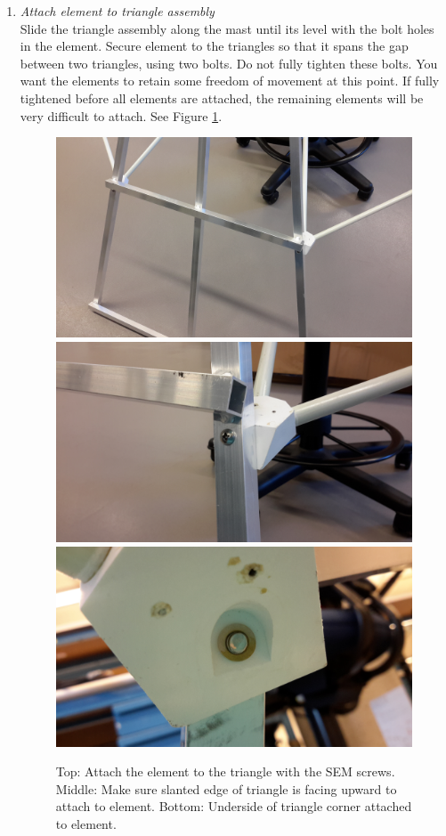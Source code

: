 \documentclass[12pt]{article}
\begin{document}
\begin{enumerate}
\begin{enumerate}
			\item \emph{Attach element to triangle assembly} \\ Slide the triangle assembly along the mast until its level with the bolt holes in the element. Secure element to the triangles so that it spans the gap between two triangles, using two bolts. Do not fully tighten these bolts. You want the elements to retain some freedom of movement at this point. If fully tightened before all elements are attached, the remaining elements will be very difficult to attach. See Figure \ref{Tri+Element}.

\begin{figure}[!p]
	\center
	\includegraphics[width=0.7\linewidth]{plots/20141125_102636.jpg}
	\includegraphics[width=0.7\linewidth]{plots/20141125_102607.jpg}
	\includegraphics[width=0.7\linewidth]{plots/20141125_102622.jpg}
	\caption{Top:  Attach the element to the triangle with the SEM screws. Middle: Make sure slanted edge of triangle is facing upward to attach to element. Bottom: Underside of triangle corner attached to element. \label{Tri+Element}}
\end{figure}
	

\end{enumerate}
\end{enumerate}
\end{document}
